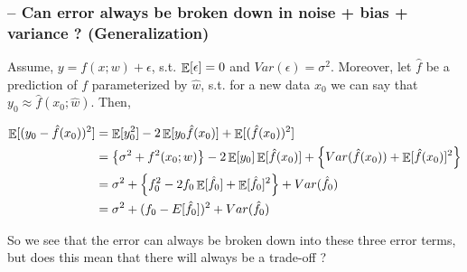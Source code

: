 \documentclass{article}
\begin{document}
\subsubsection{-- Can error always be broken down in noise + bias + variance ? (Generalization)}
Assume, $y = f(x;w)+\epsilon$, s.t. $\operatorname*{\mathop{\mathbb{E}}}[\epsilon]=0$ and $Var(\epsilon)=\sigma^2$. Moreover, let $\hat{f}$ be a prediction of $f$ parameterized by $\hat{w}$, s.t. for a new data $x_0$ we can say that $y_0 \approx \hat{f}(x_0; \hat{w})$. Then,

\begin{align*}
    \operatorname*{\mathop{\mathbb{E}}}[(y_0-\hat{f}(x_0))^2] &= \operatorname*{\mathop{\mathbb{E}}}[y_0^2] - 2\operatorname*{\mathop{\mathbb{E}}}[y_0\hat{f}(x_0)] + \operatorname*{\mathop{\mathbb{E}}}[(\hat{f}(x_0))^2]\\
    &= \left\{ \sigma^2 + f^2(x_0;w) \right\} - 2\operatorname*{\mathop{\mathbb{E}}}[y_0]\operatorname*{\mathop{\mathbb{E}}}[\hat{f}(x_0)] + \left\{ Var(\hat{f}(x_0)) + \operatorname*{\mathop{\mathbb{E}}}[\hat{f}(x_0)]^2 \right\}\\
    &= \sigma^2 + \left\{ f_0^2 - 2f_0\operatorname*{\mathop{\mathbb{E}}}[\hat{f}_0] + \operatorname*{\mathop{\mathbb{E}}}[\hat{f}_0]^2 \right\} + Var(\hat{f}_0)\\
    &= \sigma^2 + (f_0 - E[\hat{f}_0])^2 + Var(\hat{f}_0)\\
\end{align*}

So we see that the error can always be broken down into these three error terms, but does this mean that there will always be a trade-off ?

\subsubsection{} 

\subsection{}
\subsection{}
\subsection{}

\hrfullline
\end{document}

